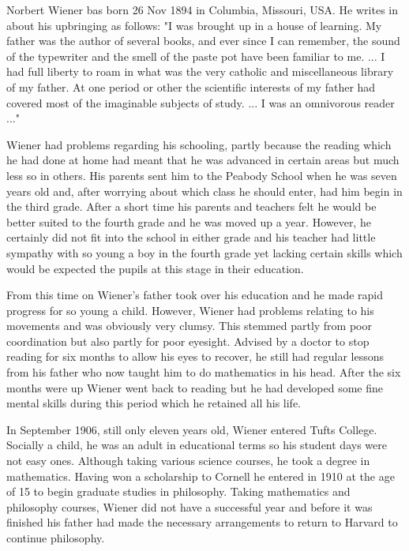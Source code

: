 Norbert Wiener bas born 26 Nov 1894 in Columbia, Missouri, USA. He writes in about his upbringing as follows: "I was brought up in a house of learning. My father was the author of several books, and ever since I can remember, the sound of the typewriter and the smell of the paste pot have been familiar to me. ... I had full liberty to roam in what was the very catholic and miscellaneous library of my father. At one period or other the scientific interests of my father had covered most of the imaginable subjects of study. ... I was an omnivorous reader ..."

Wiener had problems regarding his schooling, partly because the reading which he had done at home had meant that he was advanced in certain areas but much less so in others. His parents sent him to the Peabody School when he was seven years old and, after worrying about which class he should enter, had him begin in the third grade. After a short time his parents and teachers felt he would be better suited to the fourth grade and he was moved up a year. However, he certainly did not fit into the school in either grade and his teacher had little sympathy with so young a boy in the fourth grade yet lacking certain skills which would be expected the pupils at this stage in their education. 

From this time on Wiener's father took over his education and he made rapid progress for so young a child. However, Wiener had problems relating to his movements and was obviously very clumsy. This stemmed partly from poor coordination but also partly for poor eyesight. Advised by a doctor to stop reading for six months to allow his eyes to recover, he still had regular lessons from his father who now taught him to do mathematics in his head. After the six months were up Wiener went back to reading but he had developed some fine mental skills during this period which he retained all his life. 

In September 1906, still only eleven years old, Wiener entered Tufts College. Socially a child, he was an adult in educational terms so his student days were not easy ones. Although taking various science courses, he took a degree in mathematics.  Having won a scholarship to Cornell he entered in 1910 at the age of 15 to begin graduate studies in philosophy. Taking mathematics and philosophy courses, Wiener did not have a successful year and before it was finished his father had made the necessary arrangements to return to Harvard to continue philosophy. 

